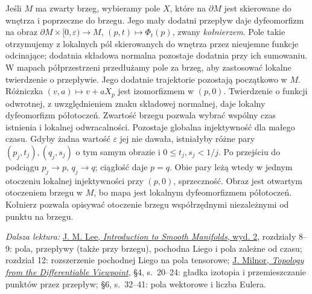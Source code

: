 \begin{uwaga}
Jeśli $M$ ma zwarty brzeg, wybieramy pole $X$, które na
$\partial M$ jest skierowane do wnętrza i poprzeczne do brzegu.
Jego mały dodatni przepływ daje dyfeomorfizm na obraz
$\partial M\times[0,\varepsilon)\to M$,
$(p,t)\mapsto\Phi_t(p)$, zwany \emph{kołnierzem}.
Pole takie otrzymujemy z lokalnych pól skierowanych do wnętrza
przez nieujemne funkcje odcinające; dodatnia składowa normalna
pozostaje dodatnia przy ich sumowaniu. W mapach półprzestrzeni
przedłużamy pole za brzeg, aby zastosować lokalne twierdzenie
o przepływie. Jego dodatnie trajektorie pozostają początkowo w $M$.
Różniczka $(v,a)\mapsto v+aX_p$ jest izomorfizmem w $(p,0)$.
Twierdzenie o funkcji odwrotnej, z uwzględnieniem znaku składowej
normalnej, daje lokalny dyfeomorfizm półotoczeń. Zwartość brzegu
pozwala wybrać wspólny czas istnienia i lokalnej odwracalności.
Pozostaje globalna injektywność dla małego czasu. Gdyby żadna
wartość $\varepsilon$ jej nie dawała, istniałyby różne pary
$(p_j,t_j),(q_j,s_j)$ o tym samym obrazie i $0\le t_j,s_j<1/j$.
Po przejściu do podciągu $p_j\to p$, $q_j\to q$; ciągłość
daje $p=q$. Obie pary leżą wtedy w jednym otoczeniu lokalnej
injektywności przy $(p,0)$, sprzeczność. Obraz jest otwartym
otoczeniem brzegu w $M$, bo mapa jest lokalnym dyfeomorfizmem
półotoczeń. Kołnierz pozwala opisywać otoczenie brzegu
współrzędnymi niezależnymi od punktu na brzegu.
\end{uwaga}

\par\smallskip
{\footnotesize\noindent\emph{Dalsza lektura:}
\href{https://doi.org/10.1007/978-1-4419-9982-5}
{J. M. Lee, \emph{Introduction to Smooth Manifolds}, wyd. 2},
rozdziały 8--9: pola, przepływy (także przy brzegu),
pochodna Liego i pola zależne od czasu;
rozdział 12: rozszerzenie pochodnej Liego na pola tensorowe;
\href{https://people.dm.unipi.it/benedett/MILNOR-TDVPOINT.pdf}
{J. Milnor, \emph{Topology from the Differentiable Viewpoint}},
§4, s.~20--24: gładka izotopia i przemieszczanie punktów
przez przepływ; §6, s.~32--41: pola wektorowe i liczba Eulera.\par}
\clearpage
